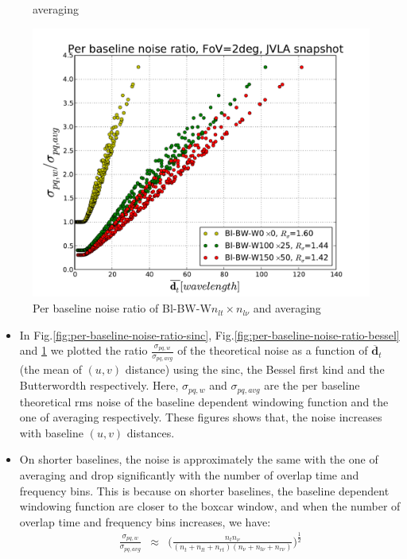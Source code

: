 \documentclass[useAMS,usenatbib]{mn2e}
\begin{document}
\begin{figure}
\begin{minipage}{0.38\linewidth}
{averaging}\label{fig:per-baseline-noise-ratio-bessel}\end{minipage}
  \begin{minipage}{0.38\linewidth}\includegraphics[width=1\textwidth]{./Figures/per-baseline-noise-ratio-BW.pdf}
  \caption{Per baseline noise ratio of Bl-BW-W$n_{lt}\times n_{l\nu}$ and averaging}\label{fig:per-baseline-noise-ratio-BW}
  \end{minipage}
\end{figure}
\begin{itemize}
 \item In Fig.\ref{fig:per-baseline-noise-ratio-sinc}, Fig.\ref{fig:per-baseline-noise-ratio-bessel} 
and \ref{fig:per-baseline-noise-ratio-BW} we plotted the ratio $\frac{\sigma_{pq,w}}{\sigma_{pq,avg}}$ of the theoretical noise as a 
function of $\overline{\mathbf{d}}_t$ (the mean of  $(u,v)$ distance) using the sinc, the Bessel first kind and the 
Butterwordth respectively. Here, $\sigma_{pq,w}$ and $\sigma_{pq,avg}$ are the per baseline theoretical rms noise of the baseline dependent 
windowing function and the one of averaging respectively. These figures shows that, the noise increases with baseline $(u,v)$ distances.
   \item On shorter baselines, the noise is approximately the same with the one of averaging and drop significantly with the number of  
overlap time and frequency bins. This is because on shorter  baselines, the baseline dependent windowing function are closer to the boxcar 
window, and when the number of overlap time  and frequency  bins increases, we have:
\begin{eqnarray*}
 \frac{\sigma_{pq, w}}{\sigma_{pq,avg}} &\approx& \Bigg(\frac{n_t n_{\nu}}{(n_t + n_{lt} + n_{rt})(n_{\nu} + n_{l\nu} + 
n_{r\nu})}\Bigg)^{\frac{1}{2}}
\end{eqnarray*}
\end{itemize}
\end{document}
